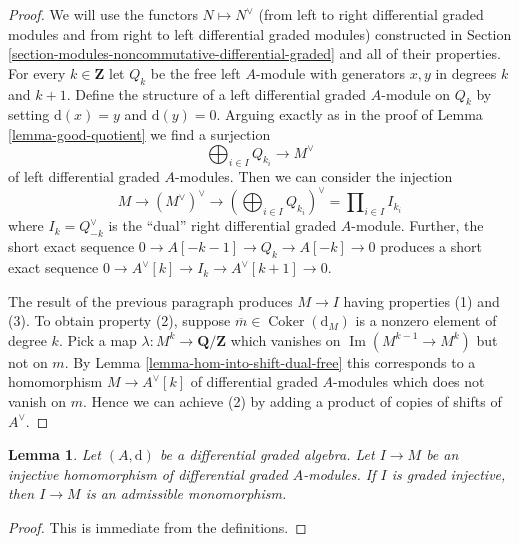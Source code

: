 \documentclass{stacks-project}
\theoremstyle{plain}
\newtheorem{lemma}[subsection]{Lemma}
\theoremstyle{definition}
\theoremstyle{remark}
\numberwithin{equation}{subsection}
\def\Im{\mathop{\mathrm{Im}}}
\def\Coker{\mathop{\mathrm{Coker}}}
\begin{document}
\begin{proof}
We will use the functors $N \mapsto N^\vee$ (from left to right
differential graded modules and from right to left differential
graded modules) constructed in
Section \ref{section-modules-noncommutative-differential-graded}
and all of their properties.
For every $k \in \mathbf{Z}$ let $Q_k$ be the free left $A$-module with
generators $x, y$ in degrees $k$ and $k + 1$. Define the structure of a
left differential graded $A$-module on $Q_k$ by setting $\text{d}(x) = y$
and $\text{d}(y) = 0$. Arguing exactly as in the proof of
Lemma \ref{lemma-good-quotient} we find a surjection
$$
\bigoplus\nolimits_{i \in I} Q_{k_i} \longrightarrow M^\vee
$$
of left differential graded $A$-modules. Then we can consider the injection
$$
M \to (M^\vee)^\vee \to (\bigoplus\nolimits_{i \in I} Q_{k_i})^\vee =
\prod\nolimits_{i \in I} I_{k_i}
$$
where $I_k = Q_{-k}^\vee$ is the ``dual'' right differential graded $A$-module.
Further, the short exact sequence $0 \to A[-k - 1] \to Q_k \to A[-k] \to 0$
produces a short exact sequence
$0 \to A^\vee[k] \to I_k \to A^\vee[k + 1] \to 0$.

\medskip\noindent
The result of the previous paragraph produces $M \to I$
having properties (1) and (3). To obtain property (2), suppose
$\overline{m} \in \Coker(\text{d}_M)$ is a nonzero element of
degree $k$. Pick a map $\lambda : M^k \to \mathbf{Q}/\mathbf{Z}$
which vanishes on $\Im(M^{k - 1} \to M^k)$ but not on $m$. By
Lemma \ref{lemma-hom-into-shift-dual-free}
this corresponds to a homomorphism $M \to A^\vee[k]$ of
differential graded $A$-modules which does not vanish on $m$.
Hence we can achieve (2) by adding
a product of copies of shifts of $A^\vee$.
\end{proof}

\begin{lemma}
\label{lemma-source-graded-injective}
Let $(A, \text{d})$ be a differential graded algebra.
Let $I \to M$ be an injective homomorphism of differential graded
$A$-modules. If $I$ is graded injective, then
$I \to M$ is an admissible monomorphism.
\end{lemma}

\begin{proof}
This is immediate from the definitions.
\end{proof}
\end{document}
